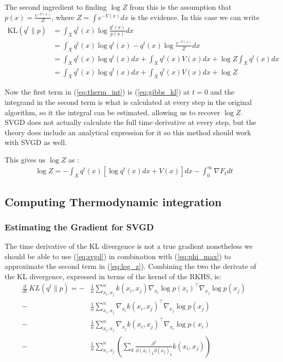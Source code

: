 \documentclass{article}
\begin{document}
    The second ingredient to finding $\log Z$ from this is the assumption that $p(x) = \frac{ e^{-V(x)} }{ Z }$, 
    where $Z = \int e^{-V(x)} dx$ is the evidence. In this case we can write
    \begin{align}
    \label{eq:gibbs_kl}
        \text{KL}( q^t \| p ) &= \int_X q^t(x) \log \frac{ q^t(x) }{ p(x) } dx \\
                        &= \int_X q^t(x) \log q^t(x) - q^t(x) \log \frac{ e^{-V(x)} }{ Z } dx \\
                        &= \int_X q^t(x) \log q^t(x) dx + \int_X q^t(x) V(x) dx + \log Z \int_X q^t(x) dx \\
                        &= \int_X q^t(x) \log q^t(x) dx + \int_X q^t(x) V(x) dx + \log Z
    \end{align}

    Now the first term in (\ref{eq:therm_int}) is (\ref{eq:gibbs_kl}) at $t=0$ and the integrand in the second term is
    what is calculated at every step in the original algorithm, so it the integral can be estimated, allowing us to 
    recover $\log Z$. SVGD does not actually calculate the full time derivative at every step, but the theory does 
    include an analytical expression for it so this method should work with SVGD as well.

    This gives us $\log Z$ as :
    \begin{align}
    \label{eq:log_z}
        \log Z = - \int_X q^t(x) [\log q^t(x) dx +  V(x)] dx 
            - \int_0^\infty \nabla F_t dt
    \end{align}


    \newpage

\subsection{Computing Thermodynamic integration}
\subsubsection{Estimating the Gradient for SVGD}
    The time derivative of the KL divergence is not a true gradient nonetheless we should be able to use
    (\ref{eq:svgd}) in combination with (\ref{eq:phi_max}) to approximate the second term in (\ref{eq:log_z}).
    Combining the two the derivate of the KL divergence, expressed in terms of the kernel of the RKHS, is:
    \begin{align}
        \label{eq:F_approximation}
        \frac{d}{dt}\ KL( q^t \| p ) = -& \frac{1}{n}\sum_{x_i,x_j}^n  k(x_i,x_j) \nabla_{x_i} \log p(x_i)^\top \nabla_{x_j} \log p(x_j)  \\ 
        -& \frac{1}{n}\sum_{x_i,x_j}^n  \nabla_{x_i} k(x_i,x_j)^\top \nabla_{x_j} \log p(x_j)  \\ 
        -& \frac{1}{n}\sum_{x_i,x_j}^n  \nabla_{x_j} k(x_i,x_j)^\top \nabla_{x_i} \log p(x_i)  \\ 
        -& \frac{1}{n}\sum_{x_i,x_j}^n \left( \sum_k \frac{ \partial^2 }{ \partial (x_i)_k \partial (x_j)_k } 
            k(x_i,x_j) \right)
    \end{align}
\end{document}
